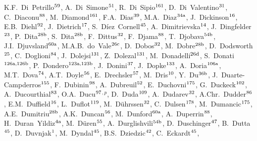 \begin{flushleft}
K.F.~Di~Petrillo$^\textrm{\scriptsize 59}$,
A.~Di~Simone$^\textrm{\scriptsize 51}$,
R.~Di~Sipio$^\textrm{\scriptsize 161}$,
D.~Di~Valentino$^\textrm{\scriptsize 31}$,
C.~Diaconu$^\textrm{\scriptsize 88}$,
M.~Diamond$^\textrm{\scriptsize 161}$,
F.A.~Dias$^\textrm{\scriptsize 39}$,
M.A.~Diaz$^\textrm{\scriptsize 34a}$,
J.~Dickinson$^\textrm{\scriptsize 16}$,
E.B.~Diehl$^\textrm{\scriptsize 92}$,
J.~Dietrich$^\textrm{\scriptsize 17}$,
S.~D\'iez~Cornell$^\textrm{\scriptsize 45}$,
A.~Dimitrievska$^\textrm{\scriptsize 14}$,
J.~Dingfelder$^\textrm{\scriptsize 23}$,
P.~Dita$^\textrm{\scriptsize 28b}$,
S.~Dita$^\textrm{\scriptsize 28b}$,
F.~Dittus$^\textrm{\scriptsize 32}$,
F.~Djama$^\textrm{\scriptsize 88}$,
T.~Djobava$^\textrm{\scriptsize 54b}$,
J.I.~Djuvsland$^\textrm{\scriptsize 60a}$,
M.A.B.~do~Vale$^\textrm{\scriptsize 26c}$,
D.~Dobos$^\textrm{\scriptsize 32}$,
M.~Dobre$^\textrm{\scriptsize 28b}$,
D.~Dodsworth$^\textrm{\scriptsize 25}$,
C.~Doglioni$^\textrm{\scriptsize 84}$,
J.~Dolejsi$^\textrm{\scriptsize 131}$,
Z.~Dolezal$^\textrm{\scriptsize 131}$,
M.~Donadelli$^\textrm{\scriptsize 26d}$,
S.~Donati$^\textrm{\scriptsize 126a,126b}$,
P.~Dondero$^\textrm{\scriptsize 123a,123b}$,
J.~Donini$^\textrm{\scriptsize 37}$,
J.~Dopke$^\textrm{\scriptsize 133}$,
A.~Doria$^\textrm{\scriptsize 106a}$,
M.T.~Dova$^\textrm{\scriptsize 74}$,
A.T.~Doyle$^\textrm{\scriptsize 56}$,
E.~Drechsler$^\textrm{\scriptsize 57}$,
M.~Dris$^\textrm{\scriptsize 10}$,
Y.~Du$^\textrm{\scriptsize 36b}$,
J.~Duarte-Campderros$^\textrm{\scriptsize 155}$,
F.~Dubinin$^\textrm{\scriptsize 98}$,
A.~Dubreuil$^\textrm{\scriptsize 52}$,
E.~Duchovni$^\textrm{\scriptsize 175}$,
G.~Duckeck$^\textrm{\scriptsize 102}$,
A.~Ducourthial$^\textrm{\scriptsize 83}$,
O.A.~Ducu$^\textrm{\scriptsize 97}$$^{,p}$,
D.~Duda$^\textrm{\scriptsize 109}$,
A.~Dudarev$^\textrm{\scriptsize 32}$,
A.Chr.~Dudder$^\textrm{\scriptsize 86}$,
E.M.~Duffield$^\textrm{\scriptsize 16}$,
L.~Duflot$^\textrm{\scriptsize 119}$,
M.~D\"uhrssen$^\textrm{\scriptsize 32}$,
C.~Dulsen$^\textrm{\scriptsize 178}$,
M.~Dumancic$^\textrm{\scriptsize 175}$,
A.E.~Dumitriu$^\textrm{\scriptsize 28b}$,
A.K.~Duncan$^\textrm{\scriptsize 56}$,
M.~Dunford$^\textrm{\scriptsize 60a}$,
A.~Duperrin$^\textrm{\scriptsize 88}$,
H.~Duran~Yildiz$^\textrm{\scriptsize 4a}$,
M.~D\"uren$^\textrm{\scriptsize 55}$,
A.~Durglishvili$^\textrm{\scriptsize 54b}$,
D.~Duschinger$^\textrm{\scriptsize 47}$,
B.~Dutta$^\textrm{\scriptsize 45}$,
D.~Duvnjak$^\textrm{\scriptsize 1}$,
M.~Dyndal$^\textrm{\scriptsize 45}$,
B.S.~Dziedzic$^\textrm{\scriptsize 42}$,
C.~Eckardt$^\textrm{\scriptsize 45}$,
$$
\end{flushleft}
